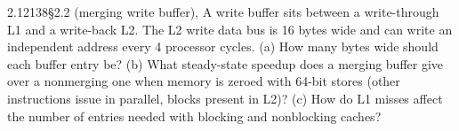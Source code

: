 \begin{tbexercise}{2.12}{138}{\S2.2 (merging write buffer), }
A write buffer sits between a write-through L1 and a write-back L2. The L2 write
data bus is 16 bytes wide and can write an independent address every 4 processor
cycles. (a) How many bytes wide should each buffer entry be? (b) What steady-state
speedup does a merging buffer give over a nonmerging one when memory is zeroed with
64-bit stores (other instructions issue in parallel, blocks present in L2)? (c) How
do L1 misses affect the number of entries needed with blocking and nonblocking
caches?
\end{tbexercise}
